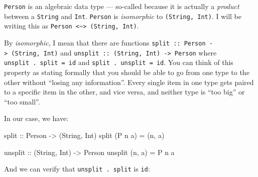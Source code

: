\documentclass[]{article}
\newenvironment{Shaded}{}{}
\newcommand{\DataTypeTok}[1]{\textcolor[rgb]{0.56,0.13,0.00}{#1}}
\newcommand{\NormalTok}[1]{#1}
\newcommand{\OtherTok}[1]{\textcolor[rgb]{0.00,0.44,0.13}{#1}}
\begin{document}
\texttt{Person} is an algebraic data type --- so-called because it is actually a
\emph{product} between a \texttt{String} and \texttt{Int}. \texttt{Person} is
\emph{isomorphic} to \texttt{(String,\ Int)}. I will be writing this as
\texttt{Person\ \textless{}\textasciitilde{}\textgreater{}\ (String,\ Int)}.

By \emph{isomorphic}, I mean that there are functions
\texttt{split\ ::\ Person\ -\textgreater{}\ (String,\ Int)} and
\texttt{unsplit\ ::\ (String,\ Int)\ -\textgreater{}\ Person} where
\texttt{unsplit\ .\ split\ =\ id} and \texttt{split\ .\ unsplit\ =\ id}. You can
think of this property as stating formally that you should be able to go from
one type to the other without ``losing any information''. Every single item in
one type gets paired to a specific item in the other, and vice versa, and
neither type is ``too big'' or ``too small''.

In our case, we have:

\begin{Shaded}
\begin{Highlighting}[]
\OtherTok{split ::} \DataTypeTok{Person} \OtherTok{{-}\textgreater{}}\NormalTok{ (}\DataTypeTok{String}\NormalTok{, }\DataTypeTok{Int}\NormalTok{)}
\NormalTok{split (}\DataTypeTok{P}\NormalTok{ n a) }\OtherTok{=}\NormalTok{ (n, a)}

\OtherTok{unsplit ::}\NormalTok{ (}\DataTypeTok{String}\NormalTok{, }\DataTypeTok{Int}\NormalTok{) }\OtherTok{{-}\textgreater{}} \DataTypeTok{Person}
\NormalTok{unsplit (n, a) }\OtherTok{=} \DataTypeTok{P}\NormalTok{ n a}
\end{Highlighting}
\end{Shaded}

And we can verify that \texttt{unsplit\ .\ split} is \texttt{id}:
\end{document}
